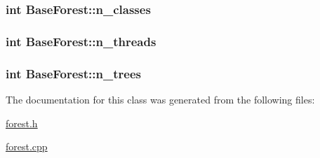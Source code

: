 \hypertarget{class_base_forest_a07e5f38350cc60220dab5661f378b776}{
\subsubsection[{n\+\_\+classes}]{\setlength{\rightskip}{0pt plus 5cm}int Base\+Forest\+::n\+\_\+classes\hspace{0.3cm}{\ttfamily [protected]}}}\label{class_base_forest_a07e5f38350cc60220dab5661f378b776}
\hypertarget{class_base_forest_a94fe86e1b426d149a11d100921cea3a4}{
\subsubsection[{n\+\_\+threads}]{\setlength{\rightskip}{0pt plus 5cm}int Base\+Forest\+::n\+\_\+threads\hspace{0.3cm}{\ttfamily [protected]}}}\label{class_base_forest_a94fe86e1b426d149a11d100921cea3a4}
\hypertarget{class_base_forest_a2549a0057ec5419fe1de52ef198125ce}{
\subsubsection[{n\+\_\+trees}]{\setlength{\rightskip}{0pt plus 5cm}int Base\+Forest\+::n\+\_\+trees\hspace{0.3cm}{\ttfamily [protected]}}}\label{class_base_forest_a2549a0057ec5419fe1de52ef198125ce}


The documentation for this class was generated from the following files\+:\begin{DoxyCompactItemize}
\item 
\hyperlink{forest_8h}{forest.\+h}\item 
\hyperlink{forest_8cpp}{forest.\+cpp}\end{DoxyCompactItemize}
